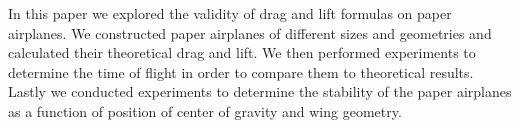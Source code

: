% 
% 
%
In this paper we explored the validity of drag and lift formulas on 
paper airplanes. We constructed paper airplanes of different sizes and geometries 
and calculated their theoretical drag and lift. We then performed experiments to determine the time of flight in order to compare them to theoretical results.
Lastly we conducted experiments to determine the stability of the paper airplanes as a function 
of position of center of gravity and wing geometry.
